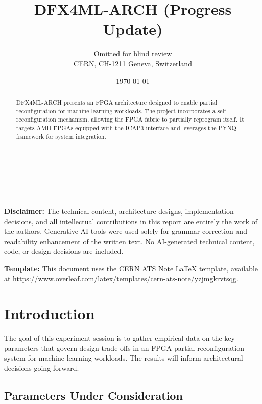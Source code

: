\documentclass{cernatsnote}
\title{DFX4ML-ARCH (Progress Update)}
\author{
	Omitted for blind review \\
	CERN, CH-1211 Geneva, Switzerland
}
\date{\today}
\begin{document}
\maketitle

\begin{abstract}
DFX4ML-ARCH presents an FPGA architecture designed to enable partial reconfiguration for machine learning workloads. The project incorporates a self-reconfiguration mechanism, allowing the FPGA fabric to partially reprogram itself. It targets AMD FPGAs equipped with the ICAP3 interface and leverages the PYNQ framework for system integration.
\end{abstract}
\\ \\ \\

\begin{small}
\noindent\textbf{Disclaimer:} The technical content, architecture designs, implementation decisions, and all intellectual contributions in this report are entirely the work of the authors. Generative AI tools were used solely for grammar correction and readability enhancement of the written text. No AI-generated technical content, code, or design decisions are included.

\medskip
\noindent\textbf{Template:} This document uses the CERN ATS Note \LaTeX{} template, available at \url{https://www.overleaf.com/latex/templates/cern-ats-note/yzjmgkrvtsqg}.
\end{small}

\bigskip

\begingroup
\color{black}
\tableofcontents
\endgroup

\pagebreak

\section{Introduction}

The goal of this experiment session is to gather empirical data on the key parameters that govern design trade-offs in an FPGA partial reconfiguration system for machine learning workloads. The results will inform architectural decisions going forward.

\subsection{Parameters Under Consideration}
\end{document}
